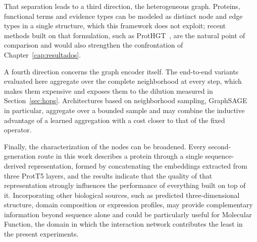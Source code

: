 \documentclass[Ingles]{ic-tese-v3}
\begin{document}
That separation leads to a third direction, the heterogeneous graph. Proteins, functional
terms and evidence types can be modeled as distinct node and edge types in a single
structure, which this framework does not exploit; recent methods built on that formulation,
such as ProtHGT~\cite{ulusoy2025prothgt}, are the natural point of comparison and would also strengthen the
confrontation of Chapter~\ref{cap:resultados}.

A fourth direction concerns the graph encoder itself. The end-to-end variants evaluated here
aggregate over the complete neighborhood at every step, which makes them expensive and
exposes them to the dilution measured in Section~\ref{sec:hops}. Architectures based on
neighborhood sampling, GraphSAGE~\cite{hamilton2017graphsage} in particular, aggregate over a
bounded sample and may
combine the inductive advantage of a learned aggregation with a cost closer to that of the
fixed operator.

Finally, the characterization of the nodes can be broadened. Every second-generation route in
this work describes a protein through a single sequence-derived representation, formed by
concatenating the embeddings extracted from three ProtT5 layers, and the results indicate that
the quality of that representation strongly influences the performance of everything built on
top of it. Incorporating other biological sources, such as predicted three-dimensional
structure, domain composition or expression profiles, may provide complementary information
beyond sequence alone and could be particularly useful for Molecular Function, the domain in
which the interaction network contributes the least in the present experiments.




\end{document}
